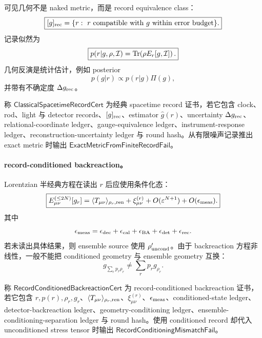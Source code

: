 可见几何不是 naked metric，而是 record equivalence class：
\[
\boxed{
[g]_{\rm rec}
=
\{r:\ r\text{ compatible with }g\text{ within error budget}\}.
}
\]
记录似然为
\[
\boxed{
p(r|g,\rho,\mathcal I)
=
{\rm Tr}\!\left(\rho E_r[g,\mathcal I]\right).
}
\]
几何反演是统计估计，例如 posterior
\[
p(g|r)\propto p(r|g)\Pi(g),
\]
并带有不确定度 \(\Delta g_{\rm rec}\)。

\begin{definition}\label{def:typed-address-biaxial-completion-classical-spacetime-record-cert}
称 \(\mathsf{ClassicalSpacetimeRecordCert}\) 为经典 spacetime record 证书，若它包含 clock、rod、light 与 detector records、\([g]_{\rm rec}\)、estimator \(\widehat g(r)\)、uncertainty \(\Delta g_{\rm rec}\)、relational-coordinate ledger、gauge-equivalence ledger、instrument-response ledger、reconstruction-uncertainty ledger 与 round hash。从有限噪声记录推出 exact metric 时输出 \(\mathsf{ExactMetricFromFiniteRecordFail}\)。
\end{definition}

\paragraph{record-conditioned backreaction。}
Lorentzian 半经典方程在读出 \(r\) 后应使用条件化态：
\[
\boxed{
E_{\mu\nu}^{(\le2N)}[g_r]
=
\langle T_{\mu\nu}\rangle_{\rho_r,{\rm ren}}
+\xi_{\mu\nu}^{(r)}
+O(\varepsilon^{N+1})
+O(\epsilon_{\rm meas}).
}
\]
其中
\[
\epsilon_{\rm meas}
=
\epsilon_{\rm dec}
+\epsilon_{\rm cal}
+\epsilon_{\rm BA}
+\epsilon_{\rm det}
+\epsilon_{\rm rec}.
\]
若未读出具体结果，则 ensemble source 使用 \(\rho'_{\rm uncond}\)。由于 backreaction 方程非线性，一般不能把 conditioned geometry 与 ensemble geometry 互换：
\[
g_{\sum_rp_r\rho_r}\neq \sum_rp_rg_{\rho_r}.
\]

\begin{definition}\label{def:typed-address-biaxial-completion-record-conditioned-backreaction-cert}
称 \(\mathsf{RecordConditionedBackreactionCert}\) 为 record-conditioned backreaction 证书，若它包含 \(r,p(r),\rho_r,g_r\)、\(\langle T_{\mu\nu}\rangle_{\rho_r,{\rm ren}}\)、\(\xi_{\mu\nu}^{(r)}\)、\(\epsilon_{\rm meas}\)、conditioned-state ledger、detector-backreaction ledger、geometry-conditioning ledger、ensemble-conditioning-separation ledger 与 round hash。使用 conditioned record 却代入 unconditioned stress tensor 时输出 \(\mathsf{RecordConditioningMismatchFail}\)。
\end{definition}

